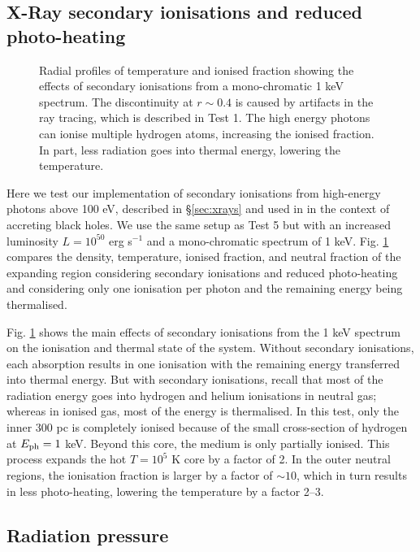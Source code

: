 \documentclass[useAMS,usenatbib]{mn2e}
\begin{document}
\subsection{X-Ray secondary ionisations and reduced photo-heating}

\begin{figure}
  \caption{\label{fig:xray_fig} Radial profiles of temperature and
    ionised fraction showing the effects of secondary ionisations from
    a mono-chromatic 1 keV spectrum.  The discontinuity at $r \sim
    0.4$ is caused by artifacts in the ray tracing, which is described
    in Test 1.  The high energy photons can ionise multiple hydrogen
    atoms, increasing the ionised fraction.  In part, less radiation
    goes into thermal energy, lowering the temperature.}
\end{figure}

Here we test our implementation of secondary ionisations from
high-energy photons above 100 eV, described in \S\ref{sec:xrays} and
used in \citet{Alvarez09} in the context of accreting black holes.  We
use the same setup as Test 5 but with an increased luminosity $L =
10^{50}$ erg s$^{-1}$ and a mono-chromatic spectrum of 1 keV.  Fig.
\ref{fig:xray_fig} compares the density, temperature, ionised
fraction, and neutral fraction of the expanding \hii region
considering secondary ionisations and reduced photo-heating and
considering only one ionisation per photon and the remaining energy
being thermalised.

Fig. \ref{fig:xray_fig} shows the main effects of secondary
ionisations from the 1 keV spectrum on the ionisation and thermal
state of the system.  Without secondary ionisations, each absorption
results in one ionisation with the remaining energy transferred into
thermal energy.  But with secondary ionisations, recall that most of
the radiation energy goes into hydrogen and helium ionisations in
neutral gas; whereas in ionised gas, most of the energy is
thermalised.  In this test, only the inner 300 pc is completely
ionised because of the small cross-section of hydrogen at $E_{\rm ph}
= 1$ keV.  Beyond this core, the medium is only partially ionised.
This process expands the hot $T = 10^5$ K core by a factor of 2.  In
the outer neutral regions, the ionisation fraction is larger by a
factor of $\sim 10$, which in turn results in less photo-heating,
lowering the temperature by a factor 2--3.

\subsection{Radiation pressure}
\end{document}
